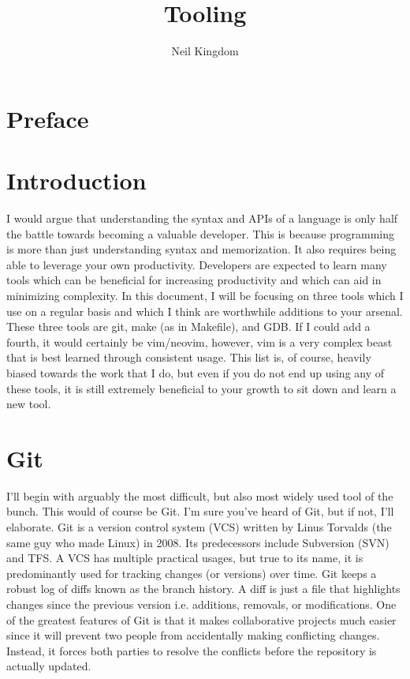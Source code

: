 \documentclass{article}
\title{Tooling}
\author{Neil Kingdom}
\begin{document}
\begin{titlingpage}

\maketitle

\end{titlingpage}

\newpage

\tableofcontents

\newpage

\section{Preface}

\section{Introduction}

I would argue that understanding the syntax and APIs of a language is only half the battle towards becoming 
a valuable developer. This is because programming is more than just understanding syntax and memorization. It 
also requires being able to leverage your own productivity. Developers are expected to learn many tools which 
can be beneficial for increasing productivity and which can aid in minimizing complexity. In this document, I 
will be focusing on three tools which I use on a regular basis and which I think are worthwhile additions to 
your arsenal. These three tools are git, make (as in Makefile), and GDB. If I could add a fourth, it would 
certainly be vim/neovim, however, vim is a very complex beast that is best learned through consistent usage. 
This list is, of course, heavily biased towards the work that I do, but even if you do not end up using any of 
these tools, it is still extremely beneficial to your growth to sit down and learn a new tool. 

\section{Git}

I'll begin with arguably the most difficult, but also most widely used tool of the bunch. This would of course 
be Git. I'm sure you've heard of Git, but if not, I'll elaborate. Git is a version control system (VCS) written 
by Linus Torvalds (the same guy who made Linux) in 2008. Its predecessors include Subversion (SVN) and TFS. A 
VCS has multiple practical usages, but true to its name, it is predominantly used for tracking changes 
(or versions) over time. Git keeps a robust log of diffs known as the branch history. A diff is just a file 
that highlights changes since the previous version i.e. additions, removals, or modifications. One of the 
greatest features of Git is that it makes collaborative projects much easier since it will prevent two people 
from accidentally making conflicting changes. Instead, it forces both parties to resolve the conflicts before 
the repository is actually updated.\\ 
\end{document}
